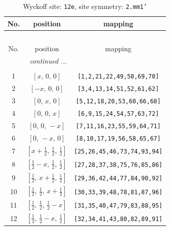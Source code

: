 \documentclass[fleqn,8pt]{jsarticle}
\begin{document}
\begin{longtable}{ccc}
\caption{Wyckoff site: {\tt 12e}, site symmetry: {\tt 2.mm1'}}
 \\
 \hline \hline
No. & position & mapping \\ \hline \endfirsthead

\multicolumn{2}{l}{\tablename\ \thetable{}} \\
 \hline \hline
No. & position & mapping \\ \hline \endhead

 \hline \hline
\multicolumn{2}{r}{\footnotesize\it continued ...} \\ \endfoot

 \hline \hline
\multicolumn{2}{r}{} \\ \endlastfoot

1 & $\left[ x,\, 0,\, 0 \right]$ & {\tt [1,2,21,22,49,50,69,70]} \\ \hline
2 & $\left[ - x,\, 0,\, 0 \right]$ & {\tt [3,4,13,14,51,52,61,62]} \\ \hline
3 & $\left[ 0,\, x,\, 0 \right]$ & {\tt [5,12,18,20,53,60,66,68]} \\ \hline
4 & $\left[ 0,\, 0,\, x \right]$ & {\tt [6,9,15,24,54,57,63,72]} \\ \hline
5 & $\left[ 0,\, 0,\, - x \right]$ & {\tt [7,11,16,23,55,59,64,71]} \\ \hline
6 & $\left[ 0,\, - x,\, 0 \right]$ & {\tt [8,10,17,19,56,58,65,67]} \\ \hline
7 & $\left[ x + \frac{1}{2},\, \frac{1}{2},\, \frac{1}{2} \right]$ & {\tt [25,26,45,46,73,74,93,94]} \\ \hline
8 & $\left[ \frac{1}{2} - x,\, \frac{1}{2},\, \frac{1}{2} \right]$ & {\tt [27,28,37,38,75,76,85,86]} \\ \hline
9 & $\left[ \frac{1}{2},\, x + \frac{1}{2},\, \frac{1}{2} \right]$ & {\tt [29,36,42,44,77,84,90,92]} \\ \hline
10 & $\left[ \frac{1}{2},\, \frac{1}{2},\, x + \frac{1}{2} \right]$ & {\tt [30,33,39,48,78,81,87,96]} \\ \hline
11 & $\left[ \frac{1}{2},\, \frac{1}{2},\, \frac{1}{2} - x \right]$ & {\tt [31,35,40,47,79,83,88,95]} \\ \hline
12 & $\left[ \frac{1}{2},\, \frac{1}{2} - x,\, \frac{1}{2} \right]$ & {\tt [32,34,41,43,80,82,89,91]} \\
\end{longtable}
\renewcommand{\arraystretch}{1.2}
\end{document}
